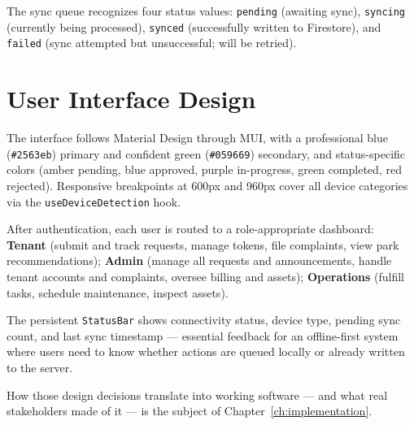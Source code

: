 The sync queue recognizes four status values: \texttt{pending} (awaiting sync), \texttt{syncing} (currently being processed), \texttt{synced} (successfully written to Firestore), and \texttt{failed} (sync attempted but unsuccessful; will be retried).

\section{User Interface Design}

The interface follows Material Design through MUI, with a professional blue (\texttt{\#2563eb}) primary and confident green (\texttt{\#059669}) secondary, and status-specific colors (amber pending, blue approved, purple in-progress, green completed, red rejected). Responsive breakpoints at 600px and 960px cover all device categories via the \texttt{useDeviceDetection} hook.

After authentication, each user is routed to a role-appropriate dashboard: \textbf{Tenant} (submit and track requests, manage tokens, file complaints, view park recommendations); \textbf{Admin} (manage all requests and announcements, handle tenant accounts and complaints, oversee billing and assets); \textbf{Operations} (fulfill tasks, schedule maintenance, inspect assets).

The persistent \texttt{StatusBar} shows connectivity status, device type, pending sync count, and last sync timestamp --- essential feedback for an offline-first system where users need to know whether actions are queued locally or already written to the server.

How those design decisions translate into working software --- and what real stakeholders made of it --- is the subject of Chapter~\ref{ch:implementation}.
